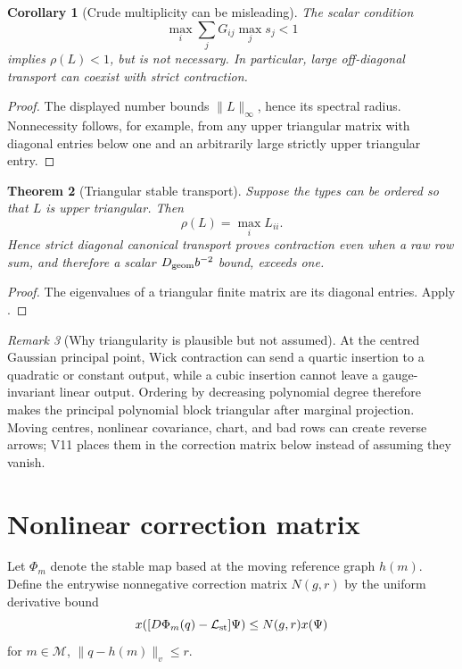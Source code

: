 \documentclass[11pt,oneside]{book}
\newtheorem{theorem}{Theorem}[chapter]
\newtheorem{corollary}[theorem]{Corollary}
\theoremstyle{definition}
\theoremstyle{remark}
\newtheorem{remark}[theorem]{Remark}
\begin{document}
\begin{corollary}[Crude multiplicity can be misleading]
\label{cor:e8v11-crude}
The scalar condition
\[
 \max_i\sum_jG_{ij}\max_js_j<1                     \label{eq:e8v11-crude}
\]
implies \(\rho(L)<1\), but is not necessary.  In particular, large
off-diagonal transport can coexist with strict contraction.
\end{corollary}

\begin{proof}
The displayed number bounds \(\|L\|_\infty\), hence its spectral
radius.  Nonnecessity follows, for example, from any upper triangular
matrix with diagonal entries below one and an arbitrarily large
strictly upper triangular entry.
\end{proof}

\begin{theorem}[Triangular stable transport]
\label{thm:e8v11-triangular}
Suppose the types can be ordered so that \(L\) is upper triangular.
Then
\[
 \rho(L)=\max_iL_{ii}.                              \label{eq:e8v11-triangular-rho}
\]
Hence strict diagonal canonical transport proves contraction even
when a raw row sum, and therefore a scalar \(D_{\rm geom}b^{-2}\)
bound, exceeds one.
\end{theorem}

\begin{proof}
The eigenvalues of a triangular finite matrix are its diagonal
entries.  Apply .
\end{proof}

\begin{remark}[Why triangularity is plausible but not assumed]
\label{rem:e8v11-Wick}
At the centred Gaussian principal point, Wick contraction can send a
quartic insertion to a quadratic or constant output, while a cubic
insertion cannot leave a gauge-invariant linear output.  Ordering by
decreasing polynomial degree therefore makes the principal
polynomial block triangular after marginal projection.  Moving
centres, nonlinear covariance, chart, and bad rows can create reverse
arrows; V11 places them in the correction matrix below instead of
assuming they vanish.
\end{remark}

\section{Nonlinear correction matrix}
\label{sec:e8v11-nonlinear}

Let \(\Phi_m\) denote the stable map based at the moving reference
graph \(h(m)\).  Define the entrywise nonnegative correction matrix
\(N(g,r)\) by the uniform derivative bound
\[
 x\!\left(
 [D\Phi_m(q)-{\cal L}_{\rm st}]\Psi
 \right)
 \le N(g,r)x(\Psi)                                  \label{eq:e8v11-N}
\]
for \(m\in{\mathcal M}\), \(\|q-h(m)\|_v\le r\).
\end{document}
